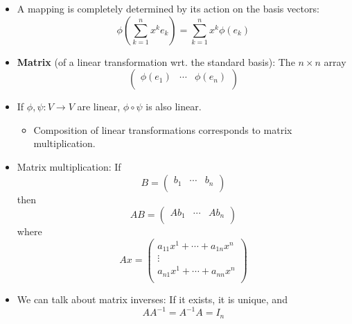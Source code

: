 \documentclass[../notes.tex]{subfiles}
\begin{document}
\begin{itemize}
    \item A mapping is completely determined by its action on the basis vectors:
    \begin{equation*}
        \phi\left( \sum_{k=1}^nx^ke_k \right) = \sum_{k=1}^nx^k\phi(e_k)
    \end{equation*}
    \item \textbf{Matrix} (of a linear transformation wrt. the standard basis): The $n\times n$ array
    \begin{equation*}
        \begin{pmatrix}
            \phi(e_1) & \cdots & \phi(e_n)\\
        \end{pmatrix}
    \end{equation*}
    \item If $\phi,\psi:V\to V$ are linear, $\phi\circ\psi$ is also linear.
    \begin{itemize}
        \item Composition of linear transformations corresponds to matrix multiplication.
    \end{itemize}
    \item Matrix multiplication: If
    \begin{equation*}
        B =
        \begin{pmatrix}
            b_1 & \cdots & b_n\\
        \end{pmatrix}
    \end{equation*}
    then
    \begin{equation*}
        AB =
        \begin{pmatrix}
            Ab_1 & \cdots & Ab_n\\
        \end{pmatrix}
    \end{equation*}
    where
    \begin{equation*}
        Ax =
        \begin{pmatrix}
            a_{11}x^1+\cdots+a_{1n}x^n\\
            \vdots\\
            a_{n1}x^1+\cdots+a_{nn}x^n\\
        \end{pmatrix}
    \end{equation*}
    \item We can talk about matrix inverses: If it exists, it is unique, and
    \begin{equation*}
        AA^{-1} = A^{-1}A = I_n

\end{equation*}
\end{itemize}
\end{document}
